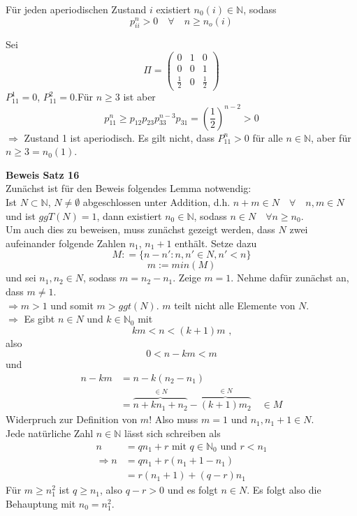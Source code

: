 \documentclass[a4paper,12pt]{article}
\begin{document}
\begin{tcolorbox}[breakable, colframe=green, colback=white, title=Satz 16]
Für jeden aperiodischen Zustand $i$ existiert $n_0(i) \in \mathbb{N}$, sodass
$$
p_{ii}^n > 0 \quad  \forall \quad n \geq n_o(i)
$$
\end{tcolorbox}

\begin{tcolorbox}[breakable, colframe=blue, colback=white, title=Beispiel 13]
Sei 
$$
\Pi = \begin{pmatrix}
		0 & 1 & 0 \\
		0 & 0 & 1\\
		\frac{1}{2} & 0 & \frac{1}{2}

\end{pmatrix}
$$
$P_{11}^1 = 0$, $P_{11}^2= 0$.Für $n \geq 3$ ist aber
$$
p_{11}^n \geq p_{12}p_{23}p_{33}^{n-3}p_{31} = \left(\frac{1}{2}\right)^{n-2} > 0
$$
$\Rightarrow$ Zustand 1 ist aperiodisch. Es gilt nicht, dass $P_{11}^n > 0$ für alle $n \in \mathbb{N}$, aber für $n \geq 3 = n_0(1)$.
\end{tcolorbox}

\textbf{Beweis Satz 16}\\
Zunächst ist für den Beweis folgendes Lemma notwendig:\\
Ist $N \subset \mathbb{N}$, $N \neq \emptyset$ abgeschlossen unter Addition,
d.h. $n+m \in N \quad \forall \quad n,m \in N$ und ist $ggT(N)=1$, dann existiert 
$n_0 \in \mathbb{N}$, sodass $n \in N \quad \forall n \geq n_0$.\\
Um auch dies zu beweisen, muss zunächst gezeigt werden, dass $N$ zwei aufeinander folgende Zahlen $n_1$, $n_{1}+1$ enthält. Setze dazu
$$
M: = \{n- n': n,n' \in N, n'<n\}
$$
$$
m:= min(M)
$$
und sei $n_1, n_2 \in N$, sodass $m = n_2 - n_1$. Zeige $m=1$. Nehme dafür zunächst an, dass $m \neq 1$.\\
$\Rightarrow m > 1$ und somit $m > ggt(N)$. $m$ teilt nicht alle Elemente von $N$.\\
$\Rightarrow$ Es gibt $n \in N$ und $k \in \mathbb{N}_0$ mit 
$$km < n < (k+1)m \text{ ,}$$ 
also 
$$0 < n-km < m$$ 
und 
\begin{align*}
n - km & = n-k(n_2 - n_1) \\
& = \overbrace{n+kn_1 + n_2}^{\in N} - \overbrace{(k+1)m_2}^{\in N} \quad \in M
\end{align*}
Widerpruch zur Definition von $m$! Also muss $m=1$ und $n_1, n_1 + 1 \in N$.\\
Jede natürliche Zahl $n \in \mathbb{N}$ lässt sich schreiben als
\begin{align*}
n & = qn_1 + r \text{ mit } q \in \mathbb{N}_0 \text{ und } r < n_1 \\
\Rightarrow n & = q n_1 + r(n_1 + 1 - n_1) \\
& = r(n_1 + 1) + (q-r)n_1
\end{align*}
Für $m \geq n_1^2$ ist $q \geq n_1$, also $q-r>0 $ und es folgt $n \in N$. 
Es folgt also die Behauptung mit $n_0 = n_1^2$.\\
\end{document}
